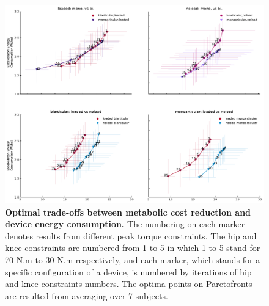 \documentclass[10pt,letterpaper]{article}
\begin{document}
\begin{figure}[hb]   
	\centering
	\includegraphics[width=\linewidth]{Pareto_Simulations_Figures/PaperFigure_Main_Pareto.pdf}
	\vspace{1mm}
	\caption{{\small\textbf{Optimal trade-offs between metabolic cost reduction and device energy consumption.} The numbering on each marker denotes results from different peak torque constraints. The hip and knee constraints are numbered from 1 to 5 in which 1 to 5 stand for 70 N.m to 30 N.m respectively, and each marker, which stands for a specific configuration of a device, is numbered by iterations of hip and knee constraints numbers. The optima points on Paretofronts are resulted from averaging over 7 subjects.}}
	\label{Fig_Main_Paretofronts}
\end{figure}
\end{document}
